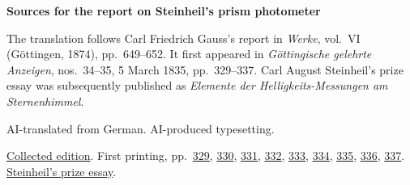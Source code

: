 \clearpage\thispagestyle{empty}
\begin{center}\Large\bfseries Sources for the report on Steinheil’s prism photometer\end{center}

The translation follows Carl Friedrich Gauss’s report in \emph{Werke}, vol.~VI (Göttingen, 1874), pp.~649--652. It first appeared in \emph{Göttingische gelehrte Anzeigen}, nos.~34--35, 5 March 1835, pp.~329--337. Carl August Steinheil’s prize essay was subsequently published as \emph{Elemente der Helligkeits-Messungen am Sternenhimmel}.

AI-translated from German. AI-produced typesetting.

\href{https://gdz.sub.uni-goettingen.de/id/PPN236007467}{Collected edition}. First printing, pp.~\href{https://images.p.sub.uni-goettingen.de/iiif/image/gdz:PPN385030444_1835_1:00000331/full/1650,/0/default.jpg}{329}, \href{https://images.p.sub.uni-goettingen.de/iiif/image/gdz:PPN385030444_1835_1:00000332/full/1650,/0/default.jpg}{330}, \href{https://images.p.sub.uni-goettingen.de/iiif/image/gdz:PPN385030444_1835_1:00000333/full/1650,/0/default.jpg}{331}, \href{https://images.p.sub.uni-goettingen.de/iiif/image/gdz:PPN385030444_1835_1:00000334/full/1650,/0/default.jpg}{332}, \href{https://images.p.sub.uni-goettingen.de/iiif/image/gdz:PPN385030444_1835_1:00000335/full/1650,/0/default.jpg}{333}, \href{https://images.p.sub.uni-goettingen.de/iiif/image/gdz:PPN385030444_1835_1:00000336/full/1650,/0/default.jpg}{334}, \href{https://images.p.sub.uni-goettingen.de/iiif/image/gdz:PPN385030444_1835_1:00000337/full/1650,/0/default.jpg}{335}, \href{https://images.p.sub.uni-goettingen.de/iiif/image/gdz:PPN385030444_1835_1:00000338/full/1650,/0/default.jpg}{336}, \href{https://images.p.sub.uni-goettingen.de/iiif/image/gdz:PPN385030444_1835_1:00000339/full/1650,/0/default.jpg}{337}. \href{https://doi.org/10.3931/e-rara-95717}{Steinheil’s prize essay}.

\clearpage
